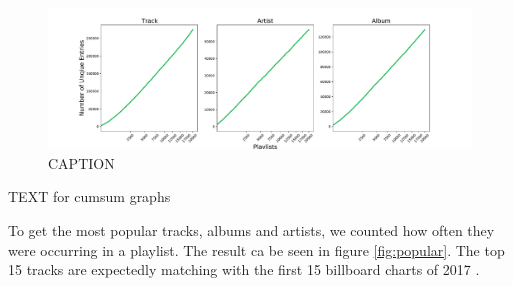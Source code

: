 \begin{figure}[ht]
    \centering
    \includegraphics[width=\textwidth]{fig/unique_to_playlist.pdf}
    \caption{CAPTION}
    \label{fig:unique_to_playlist}
\end{figure}
\answerTODO{} TEXT for cumsum graphs



To get the most popular tracks, albums and artists, we counted how often they were occurring in a playlist. The result ca be seen in figure \ref{fig:popular}. The top 15 tracks are expectedly matching with the first 15 billboard charts of 2017 \cite{BillboardMedia}.

